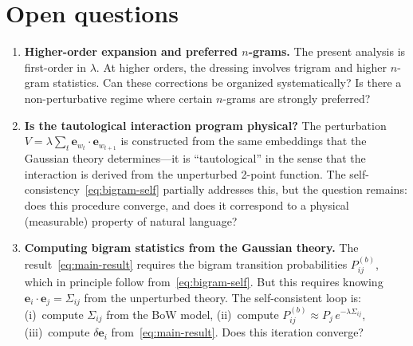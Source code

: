\documentclass[11pt]{article}
\newcommand{\ee}{\bm{e}}
\begin{document}
\section{Open questions}\label{sec:open}

\begin{enumerate}
    \item \textbf{Higher-order expansion and preferred $n$-grams.} The present analysis is first-order in $\lambda$. At higher orders, the dressing involves trigram and higher $n$-gram statistics. Can these corrections be organized systematically? Is there a non-perturbative regime where certain $n$-grams are strongly preferred?

    \item \textbf{Is the tautological interaction program physical?} The perturbation $V = \lambda \sum_t \ee_{w_t} \cdot \ee_{w_{t+1}}$ is constructed from the same embeddings that the Gaussian theory determines---it is ``tautological'' in the sense that the interaction is derived from the unperturbed 2-point function. The self-consistency~\eqref{eq:bigram-self} partially addresses this, but the question remains: does this procedure converge, and does it correspond to a physical (measurable) property of natural language?

    \item \textbf{Computing bigram statistics from the Gaussian theory.} The result~\eqref{eq:main-result} requires the bigram transition probabilities $P_{ij}^{(b)}$, which in principle follow from~\eqref{eq:bigram-self}. But this requires knowing $\ee_i \cdot \ee_j = \Sigma_{ij}$ from the unperturbed theory. The self-consistent loop is: (i)~compute $\Sigma_{ij}$ from the BoW model, (ii)~compute $P_{ij}^{(b)} \approx P_j\, e^{-\lambda \Sigma_{ij}}$, (iii)~compute $\delta\ee_i$ from~\eqref{eq:main-result}. Does this iteration converge?
\end{enumerate}
\end{document}
